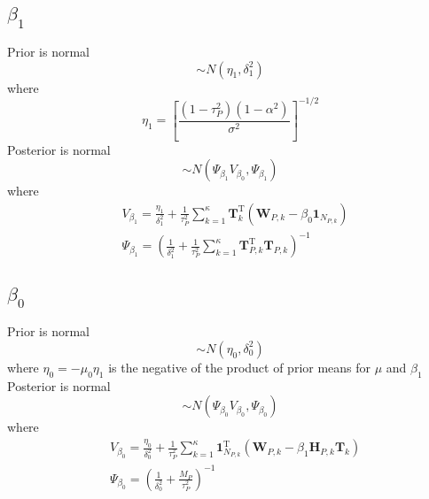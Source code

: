 \documentclass[12pt, letterpaper]{article}
\begin{document}
\subsection{$\beta_1$}
Prior is normal
\begin{equation}
	\sim N\left(\eta_{1}, \delta_{1}^{2}\right)
\end{equation}
where
\begin{equation}
	\eta_{1}=\left[\frac{\left(1-\tau_{P}^{2}\right)\left(1-\alpha^{2}\right)}{\sigma^{2}}\right]^{-1 / 2}
\end{equation}
Posterior is normal
\begin{equation}
	\sim N\left(\Psi_{\beta_{1}} V_{\beta_{0}}, \Psi_{\beta_{1}}\right)
\end{equation}
where
\begin{align}
&V_{\beta_{1}}=\frac{\eta_{1}}{\delta_{1}^{2}}+\frac{1}{\tau_{P}^{2}} \sum_{k=1}^{\kappa} \mathbf{T}_{k}^{\mathrm{T}}\left(\mathbf{W}_{P, k}-\beta_{0} \mathbf{1}_{N_{P, k}}\right) \\
&\Psi_{\beta_{1}}=\left(\frac{1}{\delta_{1}^{2}}+\frac{1}{\tau_{P}^{2}} \sum_{k=1}^{\kappa} \mathbf{T}_{P, k}^{\mathrm{T}} \mathbf{T}_{P, k}\right)^{-1}
\end{align}

\subsection{$\beta_0$}
Prior is normal
\begin{equation}
	\sim N\left(\eta_{0}, \delta_{0}^{2}\right)
\end{equation}
where $\eta_{0}=-\mu_0\eta_{1}$ is the negative of the product of prior means
for $\mu$ and $\beta_1$\\
Posterior is normal
\begin{equation}
	\sim N\left(\Psi_{\beta_{0}} V_{\beta_{0}}, \Psi_{\beta_{0}}\right)
\end{equation}
where
\begin{align}
&V_{\beta_{0}}=\frac{\eta_{0}}{\delta_{0}^{2}}+\frac{1}{\tau_{P}^{2}} \sum_{k=1}^{\kappa} \mathbf{1}_{N_{P, k}}^{\mathrm{T}}\left(\mathbf{W}_{P, k}-\beta_{1} \mathbf{H}_{P, k} \mathbf{T}_{k}\right) \\
&\Psi_{\beta_{0}}=\left(\frac{1}{\delta_{0}^{2}}+\frac{M_{P}}{\tau_{P}^{2}}\right)^{-1}
\end{align}
\end{document}
